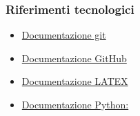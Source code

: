 \documentclass[10pt]{article}
\begin{document}
        \subsubsection{Riferimenti tecnologici}
        \begin{itemize}
            \item \href{https://git-scm.com/docs}{Documentazione git}
            \item \href{https://docs.github.com/en}{Documentazione GitHub}
            \item \href{https://www.latex-project.org/help/documentation/}{Documentazione LATEX}
            \item \href{https://www.python.org/doc/}{Documentazione Python:}
        \end{itemize}
\end{document}
